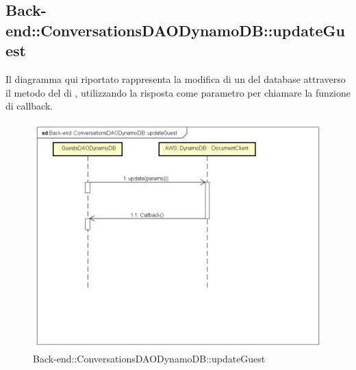 \subsection{Back-end::ConversationsDAODynamoDB::updateGuest}
Il diagramma qui riportato rappresenta la modifica di un  del database attraverso il metodo  del  di , utilizzando la risposta come parametro per chiamare la funzione di callback.
 \begin{figure}[h] \centering \includegraphics[width=\textwidth,height=\textheight,keepaspectratio]{images/diagrams/back-end/Ufficial_Backend/Back-endConversationsDAODynamoDBupdateGuest.png} 	\caption{Back-end::ConversationsDAODynamoDB::updateGuest}
\end{figure}
\newpage


